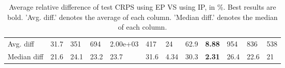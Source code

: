 \begin{table}[ht!]
\begin{tabular}{llllllllllll}
   \hline
Avg. diff & 31.7 & 351 & 694 &  2.00e+03 & 417 & 24 & 62.9 & \textbf{8.88} & 954 & 836 & 538 \\ 
  Median diff & 21.6 & 24.1 & 23.2 & 23.7 & 31.6 & 4.34 & 30.3 & \textbf{2.31} & 26.4 & 22.6 & 21 \\ 
   \hline
\hline
\end{tabular}
\endgroup
\caption{Average relative difference of test CRPS using EP VS using IP, in \%. 
                  Best results are bold. 
                  'Avg. diff.' denotes the average of each column.
                  'Median diff.' denotes the median of each column.} 
\label{TABLES/table_results_CRPS_only_num_EP_VS_IP}
\end{table}
